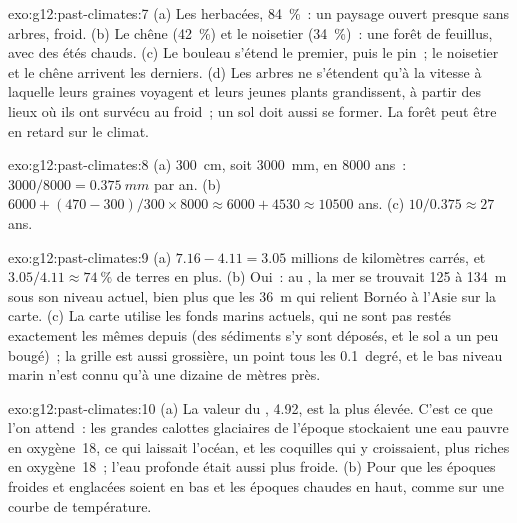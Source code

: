 \begin{solution}{exo:g12:past-climates:7}
(a) Les herbacées, \qty{84}{\percent}~: un paysage ouvert presque sans
arbres, froid. (b) Le chêne (\qty{42}{\percent}) et le noisetier
(\qty{34}{\percent})~: une forêt de feuillus, avec des étés chauds. (c) Le
bouleau s'étend le premier, puis le pin~; le noisetier et le chêne arrivent
les derniers. (d) Les arbres ne s'étendent qu'à la vitesse à laquelle leurs
graines voyagent et leurs jeunes plants grandissent, à partir des lieux où
ils ont survécu au froid~; un sol doit aussi se former. La forêt peut être
en retard sur le climat.
\end{solution}

\begin{solution}{exo:g12:past-climates:8}
(a) \qty{300}{cm}, soit \qty{3000}{mm}, en \num{8000} ans~: $3000/8000 =
\qty{0.375}{mm}$ par an. (b) $\num{6000} + (470 - 300)/300 \times \num{8000}
\approx \num{6000} + \num{4530} \approx \num{10500}$ ans. (c) $10/0.375
\approx 27$ ans.
\end{solution}

\begin{solution}{exo:g12:past-climates:9}
(a) $7.16 - 4.11 = 3.05$ millions de kilomètres carrés, et $3.05/4.11 \approx
\qty{74}{\percent}$ de terres en plus. (b) Oui~: au , la mer se trouvait 125 à \qty{134}{m} sous son niveau actuel,
bien plus que les \qty{36}{m} qui relient Bornéo à l'Asie sur la carte.
(c) La carte utilise les fonds marins actuels, qui ne sont pas restés
exactement les mêmes depuis (des sédiments s'y sont déposés, et le sol a
un peu bougé)~; la grille est aussi grossière, un point tous les
0.1~degré, et le bas niveau marin n'est connu qu'à une dizaine de mètres
près.
\end{solution}

\begin{solution}{exo:g12:past-climates:10}
(a) La valeur du , \qty{4.92}{\permil}, est la plus
élevée. C'est ce que l'on attend~: les grandes calottes glaciaires de
l'époque stockaient une eau pauvre en oxygène~18, ce qui laissait l'océan,
et les coquilles qui y croissaient, plus riches en oxygène~18~; l'eau
profonde était aussi plus froide. (b) Pour que les époques froides et
englacées soient en bas et les époques chaudes en haut, comme sur une
courbe de température.
\end{solution}

